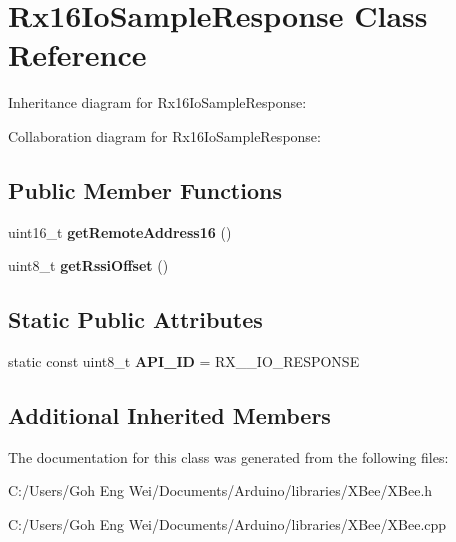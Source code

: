 \hypertarget{class_rx16_io_sample_response}{}\section{Rx16\+Io\+Sample\+Response Class Reference}
\label{class_rx16_io_sample_response}


Inheritance diagram for Rx16\+Io\+Sample\+Response\+:


Collaboration diagram for Rx16\+Io\+Sample\+Response\+:
\subsection*{Public Member Functions}
\begin{DoxyCompactItemize}
\item 
\hypertarget{class_rx16_io_sample_response_ab35f8039eebc6c969563f769fdae8f21}{}\label{class_rx16_io_sample_response_ab35f8039eebc6c969563f769fdae8f21} 
uint16\+\_\+t {\bfseries get\+Remote\+Address16} ()
\item 
\hypertarget{class_rx16_io_sample_response_a3b3437d05701cdaf86bc54a5a2acb026}{}\label{class_rx16_io_sample_response_a3b3437d05701cdaf86bc54a5a2acb026} 
uint8\+\_\+t {\bfseries get\+Rssi\+Offset} ()
\end{DoxyCompactItemize}
\subsection*{Static Public Attributes}
\begin{DoxyCompactItemize}
\item 
\hypertarget{class_rx16_io_sample_response_a651ffcd57f1b1370acf31411cb072e62}{}\label{class_rx16_io_sample_response_a651ffcd57f1b1370acf31411cb072e62} 
static const uint8\+\_\+t {\bfseries A\+P\+I\+\_\+\+ID} = R\+X\+\_\+\_\+\+I\+O\+\_\+\+R\+E\+S\+P\+O\+N\+SE
\end{DoxyCompactItemize}
\subsection*{Additional Inherited Members}


The documentation for this class was generated from the following files\+:\begin{DoxyCompactItemize}
\item 
C\+:/\+Users/\+Goh Eng Wei/\+Documents/\+Arduino/libraries/\+X\+Bee/X\+Bee.\+h\item 
C\+:/\+Users/\+Goh Eng Wei/\+Documents/\+Arduino/libraries/\+X\+Bee/X\+Bee.\+cpp\end{DoxyCompactItemize}
